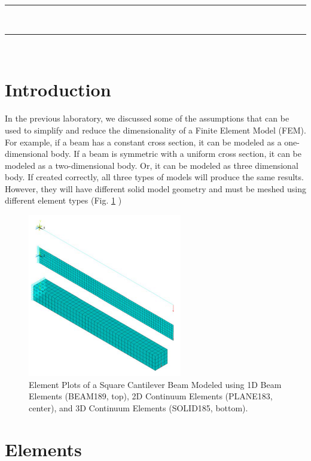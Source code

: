 \documentclass[letterpaper,pdftex]{article}
\begin{document}
\noindent
\textcolor{gray}{\rule{\textwidth}{0.5pt}}\\
\renewcommand{\tablename}{Tabla}
\renewcommand{\arraystretch}{1.2}
\renewcommand\contentsname{Outline}
\tableofcontents

\noindent
\textcolor{gray}{\rule{\textwidth}{0.5pt}}\\

\section{Introduction}

In the previous laboratory, we discussed some of the assumptions that can be used to simplify and reduce the dimensionality of a Finite Element Model (FEM). For example, if a beam has a constant cross section, it can be modeled as a one-dimensional body. If a beam is symmetric with a uniform cross section, it can be modeled as a two-dimensional body. Or, it can be modeled as three dimensional body. If created correctly, all three types of models will produce the same results. However, they will have different solid model geometry and must be meshed using different element types (Fig. \ref{fig:cantilever} )

\begin{figure}[h]
   \centering
   \includegraphics[width=0.6\textwidth]{cantileverbeam}
   \caption{Element Plots of a Square Cantilever Beam Modeled using 1D Beam Elements (BEAM189, top), 2D Continuum Elements (PLANE183, center), and 3D Continuum Elements (SOLID185, bottom).}
   \label{fig:cantilever}
\end{figure}

\section{Elements}
\end{document}
